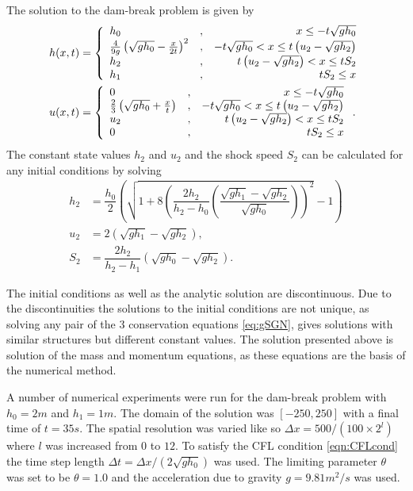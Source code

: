 \documentclass[10pt]{elsarticle}
\begin{document}
The solution to the dam-break problem is given by
\begin{align}
h(x,t) &= \left \lbrace \begin{array}{l c r}
h_0 &,& x \le -t\sqrt{g h_0} \\
\frac{4}{9g} \left(\sqrt{gh_0} - \frac{x}{2t}\right)^2 &,&  -t\sqrt{g h_0} < x \le t \left(u_2 - \sqrt{g h_2}\right)  \\
h_2 &,&  t \left(u_2 - \sqrt{g h_2}\right) < x \le t S_2  \\
h_1 &,&   t S_2 \le x \\
\end{array} \right.  \\
u(x,t) &= \left \lbrace \begin{array}{l c r}
0 &,& x \le -t\sqrt{g h_0} \\
\frac{2}{3} \left(\sqrt{gh_0} + \frac{x}{t}\right) &,&  -t\sqrt{g h_0} < x \le t \left(u_2 - \sqrt{g h_2}\right)  \\
u_2 &,&  t \left(u_2 - \sqrt{g h_2}\right) < x \le t S_2  \\
0 &,&   t S_2 \le x \\
\end{array} \right. .
\end{align}
%
The constant state values $h_2$ and $u_2$ and the shock speed $S_2$ can be calculated for any initial conditions by solving
\begin{align}
\label{eq:SWWEMiddleState}
h_2 &= \dfrac{h_0}{2} \left(  \sqrt{1 + 8 \left( \dfrac{2 h_2}{h_2 - h_0} \left(\dfrac{\sqrt{gh_1} - \sqrt{gh_2}}{\sqrt{gh_0}}\right)\right)^2 } - 1 \right) \\
u_2 &= 2\left(\sqrt{gh_1} - \sqrt{gh_2} \right),\\
S_2 &= \dfrac{2 h_2}{h_2 - h_1}\left(\sqrt{gh_0} - \sqrt{gh_2} \right).
\end{align}

The initial conditions as well as the analytic solution are discontinuous. Due to the discontinuities the solutions to the initial conditions are not unique, as solving any pair of the 3 conservation equations \eqref{eq:gSGN}, gives solutions with similar structures but different constant values. The solution presented above is solution of the mass and momentum equations, as these equations are the basis of the numerical method.

A number of numerical experiments were run for the dam-break problem with $h_0 = 2m$ and $h_1 = 1m$. The domain of the solution was $\left[-250,250\right]$ with a final time of $t=35s$.  The spatial resolution was varied like so $\Delta x = 500 / (100 \times 2^{l})$ where $l$ was increased from $0$ to $12$. To satisfy the CFL condition \eqref{eqn:CFLcond} the time step length $\Delta t = \Delta x  / \left( 2 \sqrt{g h_0}\right)$ was used. The limiting parameter $\theta$ was set to be $\theta = 1.0$ and the acceleration due to gravity $g = 9.81 m^2/s$ was used. 
\end{document}
